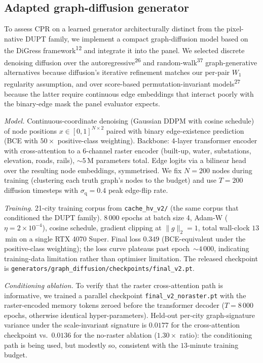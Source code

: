 \documentclass[10pt,a4paper]{article}
\begin{document}
\subsection{Adapted graph-diffusion generator}

To assess CPR on a learned generator architecturally distinct
from the pixel-native DUPT family, we implement a compact
graph-diffusion model based on the DiGress
framework\textsuperscript{12} and integrate it into the panel.
We selected discrete denoising diffusion over the
autoregressive\textsuperscript{26} and random-walk\textsuperscript{37}
graph-generative alternatives because diffusion's iterative refinement
matches our per-pair $W_1$ regularity assumption, and over
score-based permutation-invariant models\textsuperscript{27} because
the latter require continuous edge embeddings that interact poorly
with the binary-edge mask the panel evaluator expects.

\textit{Model.} Continuous-coordinate denoising (Gaussian DDPM
with cosine schedule) of node positions
$x \in [0, 1]^{N \times 2}$ paired with binary edge-existence
prediction (BCE with $50\times$ positive-class weighting).
Backbone: 4-layer transformer encoder with cross-attention to a
6-channel raster encoder (built-up, water, substations,
elevation, roads, rails), $\sim 5$\,M parameters total. Edge
logits via a bilinear head over the resulting node embeddings,
symmetrised. We fix $N = 200$ nodes during training (clustering
each truth graph's nodes to the budget) and use $T = 200$
diffusion timesteps with $\sigma_{\mathrm{q}} = 0.4$ peak
edge-flip rate.

\textit{Training.} 21-city training corpus from
\texttt{cache\_hv\_v2/} (the same corpus that conditioned the
DUPT family). 8\,000 epochs at batch size 4, Adam-W
($\eta = 2\times 10^{-4}$), cosine schedule, gradient clipping at
$\|g\|_2 = 1$, total wall-clock $13$\,min on a single RTX 4070
Super. Final loss $0.349$ (BCE-equivalent under the
positive-class weighting); the loss curve plateaus past
epoch~$\sim 4\,000$, indicating training-data limitation rather
than optimiser limitation. The released checkpoint is
\texttt{generators/graph\_diffusion/checkpoints/final\_v2.pt}.

\textit{Conditioning ablation.} To verify that the raster
cross-attention path is informative, we trained a parallel
checkpoint \texttt{final\_v2\_noraster.pt} with the
raster-encoded memory tokens zeroed before the transformer
decoder ($T = 8\,000$ epochs, otherwise identical hyper-parameters).
Held-out per-city graph-signature variance under the
scale-invariant signature is $0.0177$ for the cross-attention
checkpoint vs.\ $0.0136$ for the no-raster ablation
($1.30\times$ ratio): the conditioning path is being used, but
modestly so, consistent with the $13$-minute training budget.
\end{document}
